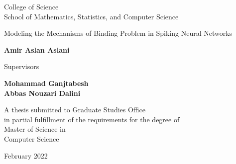\documentclass[12pt]{report}
\begin{document}
\begin{latin}
\begin{center}
			College of Science\\
			School of Mathematics, Statistics, and Computer Science
		\end{center}
		
		\begin{center}
		\end{center}
		
		\begin{center}
			\huge{Modeling the Mechanisms of Binding Problem in Spiking Neural Networks}
		\end{center}
		
		\begin{center}
		\end{center}
		
		\begin{center}
			\textbf{
				Amir Aslan Aslani
				\\[30pt]
			}
		\end{center}
		
		
		\begin{center}
			Supervisors
		\end{center}
		\begin{center}
			\textbf{
				Mohammad Ganjtabesh
				\\[5pt]
				Abbas Nouzari Dalini
			}
		\end{center}
		
		
		\vspace{3cm}
		\begin{center}
			A thesis submitted to Graduate Studies Office\\
			in partial fulfillment of the requirements for the degree of \\
			Master of Science in\\
			Computer Science
		\end{center}
		
		\begin{center}
			February 2022
		\end{center}
		
		
	\end{latin}
	
\end{document}
